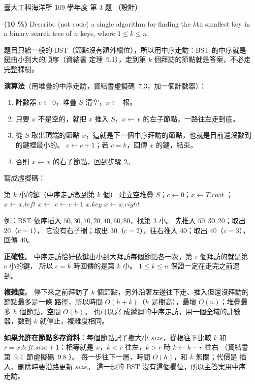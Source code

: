 \begin{pastexam}[label={px:ntu-109-esoe-ds-03}]{臺大工科海洋所 109 學年度 第 3 題}
（設計）

\textbf{(10 \%)} Describe (not code) a single algorithm for finding the $k$th smallest key in a
binary search tree of $n$ keys, where $1\le k\le n$.
\end{pastexam}

\begin{pastsoln}
題目只給一般的 BST（節點沒有額外欄位），所以用中序走訪：BST 的中序就是鍵由小到大的順序（資結書
定理~9.1），走到第 $k$ 個拜訪的節點就是答案，不必走完整棵樹。

\textbf{演算法}（用堆疊的中序走訪，資結書虛擬碼~7.3，加一個計數器）：
\begin{enumerate}
\item 計數器 $c \gets 0$，堆疊 $S$ 清空，$x \gets$ 根。
\item 只要 $x$ 不是空的，就把 $x$ 推入 $S$，$x \gets x$ 的左子節點，一路往左走到底。
\item 從 $S$ 取出頂端的節點 $x$，這就是下一個中序拜訪的節點，也就是目前還沒數到的鍵裡最小的。
$c \gets c + 1$；若 $c = k$，回傳 $x$ 的鍵，結束。
\item 否則 $x \gets x$ 的右子節點，回到步驟 2。
\end{enumerate}
寫成虛擬碼：
\begin{pseudo}{第 $k$ 小的鍵（中序走訪數到第 $k$ 個）}
    \State 建立空堆疊 $S$；$c \gets 0$；$x \gets T.\mathit{root}$
            \State {}；$x \gets x.\mathit{left}$
        \EndWhile
        \State $x \gets$ 
        \State $c \gets c + 1$
            \State \Return $x.\mathit{key}$
        \EndIf
        \State $x \gets x.\mathit{right}$
    \EndWhile
\EndFunction
\end{pseudo}

例：BST 依序插入 $50, 30, 70, 20, 40, 60, 80$，找第 $3$ 小。 先推入 $50, 30, 20$；取出 $20$（$c = 1$），
它沒有右子樹；取出 $30$（$c = 2$），往右推入 $40$；取出 $40$（$c = 3$），回傳 $40$。

\textbf{正確性}。 中序走訪恰好依鍵由小到大拜訪每個節點各一次，第 $c$ 個拜訪的就是第 $c$ 小的鍵，
所以 $c = k$ 時回傳的是第 $k$ 小。 $1 \le k \le n$ 保證一定在走完之前遇到。

\textbf{複雜度}。 停下來之前拜訪了 $k$ 個節點，另外沿著左邊往下走、推入但還沒拜訪的節點最多是一條
路徑，所以時間 $O(h + k)$（$h$ 是樹高），最壞 $O(n)$；堆疊最多 $h$ 個節點，空間 $O(h)$。 也可以寫
成遞迴的中序走訪，用一個全域的計數器，數到 $k$ 就停止，複雜度相同。

\textbf{如果允許在節點多存資料}：每個節點記子樹大小 $\mathit{size}$，從根往下比較 $k$ 和
$r = x.\mathit{left}.\mathit{size} + 1$：相等就是 $x$，$k < r$ 往左，$k > r$ 時 $k \gets k - r$ 往右
（資結書第~9.4~節虛擬碼~9.8 ）。 每一步往下一層，時間 $O(h)$，和 $k$ 無關；代價是
插入、刪除時要沿路更新 $\mathit{size}$。 這一題的 BST 沒有這個欄位，所以主答案用中序走訪。
\end{pastsoln}
